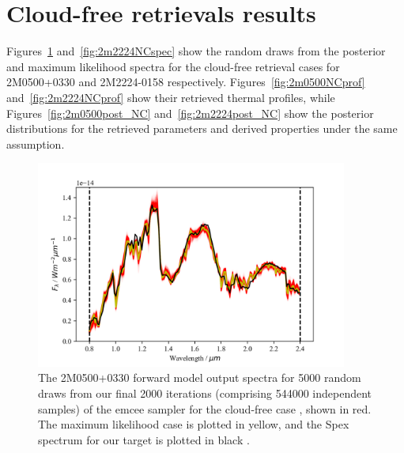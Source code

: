 \documentclass[useAMS,usenatbib]{mn2e}
\begin{document}
\section{Cloud-free retrievals results}
\label{sec:NC}

Figures~\ref{fig:2m0500NCspec} and~\ref{fig:2m2224NCspec} show the random draws from the posterior and maximum likelihood spectra for the cloud-free retrieval cases for 2M0500+0330 and 2M2224-0158 respectively. Figures~\ref{fig:2m0500NCprof} and~\ref{fig:2m2224NCprof} show their retrieved thermal profiles, while Figures~\ref{fig:2m0500post_NC} and~\ref{fig:2m2224post_NC} show the posterior distributions for the retrieved parameters and derived properties under the same assumption. 

\begin{figure}
\hspace{-0.8cm}\includegraphics[width=290pt]{2M0500_specSPAG_NoCloud_ucl.png}
\caption{ The 2M0500+0330 forward model output spectra for 5000 random draws from our final 2000 iterations (comprising 544000 independent samples) of the {\sc emcee} sampler for the cloud-free case , shown in red. The maximum likelihood case is plotted in yellow, and the Spex spectrum for our target is plotted in black \citep{gagliuffi2014}. 
\label{fig:2m0500NCspec}}
\end{figure}
\end{document}
